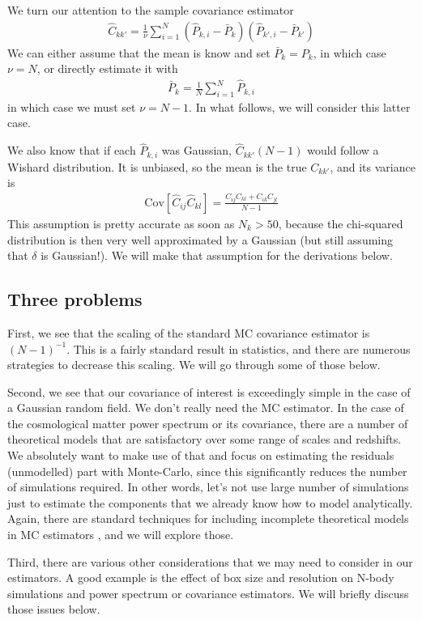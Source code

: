 \documentclass{aastex6}
\newcommand{\eqn}[1]{\begin{eqnarray}#1\end{eqnarray}}
\begin{document}
We turn our attention to the sample covariance estimator
\eqn{
	\hat{C}_{kk'} = \frac{1}{\nu}  \sum_{i=1}^{N} (\hat{P}_{k, i} - \bar{P}_{k})(\hat{P}_{k', i} - \bar{P}_{k'})
}
We can either assume that the mean is know and set $\bar{P}_{k}=P_k$, in which case $\nu=N$, or directly estimate it with
\eqn{
	\bar{P}_{k} = \frac{1}{N}  \sum_{i=1}^{N} \hat{P}_{k, i}
}
in which case we must set $\nu=N-1$. In what follows, we will consider this latter case. 

We also know that if each $\hat{P}_{k, i}$ was Gaussian, $\hat{C}_{kk'} (N-1)$ would follow a Wishard distribution. It is unbiased, so the mean is the true $C_{kk'}$, and its variance is
\eqn{
	\mathrm{Cov}[\hat{C}_{ij} \hat{C}_{kl}] = \frac{C_{ij}C_{kl} + C_{ik}C_{jl}}{N-1}
}
This assumption is pretty accurate as soon as $N_k>50$, because the chi-squared distribution is then very well approximated by a Gaussian (but still assuming that $\delta$ is Gaussian!). 
We will make that assumption for the derivations below.


\subsection{Three problems}

First, we see that the scaling of the standard MC covariance estimator is $(N-1)^{-1}$.
This is a fairly standard result in statistics, and there are numerous strategies to decrease this scaling. 
We will go through some of those below.

Second, we see that our covariance of interest is exceedingly simple in the case of a Gaussian random field. We don't really need the MC estimator. 
In the case of the cosmological matter power spectrum or its covariance, there are a number of theoretical models that are satisfactory over some range of scales and redshifts. 
We absolutely want to make use of that and focus on estimating the residuals (unmodelled) part with Monte-Carlo, since this significantly reduces the number of simulations required. 
In other words, let's not use large number of simulations just to estimate the components that we already know how to model analytically.
Again, there are standard techniques for including incomplete theoretical models in MC estimators , and we will explore those.

Third, there are various other considerations that we may need to consider in our estimators. A good example is the effect of box size and resolution on N-body simulations and power spectrum or covariance estimators. 
We will briefly discuss those issues below.
\end{document}
